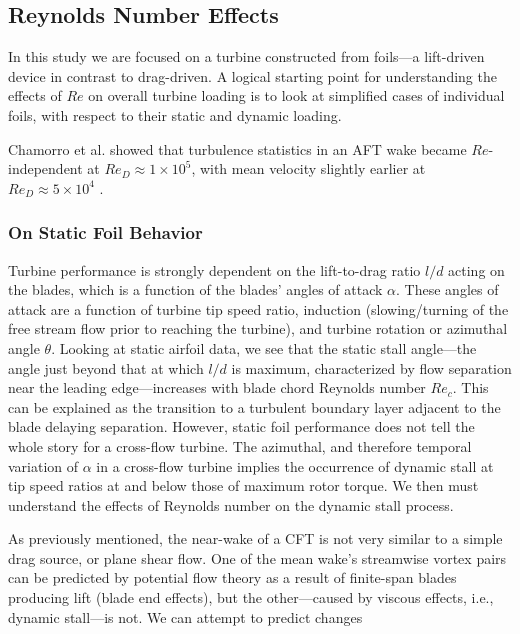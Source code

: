 \documentclass[energies,article,accept,moreauthors,pdftex,12pt,a4paper]{mdpi}
\begin{document}

\subsection{Reynolds Number Effects}

In this study we are focused on a turbine constructed from foils---a lift-driven
device in contrast to drag-driven. A logical starting point for understanding
the effects of $Re$ on overall turbine loading is to look at simplified cases
of individual foils, with respect to their static and dynamic loading. 

Chamorro et al. showed that turbulence statistics in an AFT wake became
$Re$-independent at $Re_D \approx 1 \times 10^5$, with mean velocity slightly
earlier at $Re_D \approx 5 \times 10^4$ \cite{Chamorro2012}.

\subsubsection{On Static Foil Behavior}

Turbine performance is strongly dependent on the lift-to-drag ratio $l/d$ acting
on the blades, which is a function of the blades' angles of attack $\alpha$.
These angles of attack are a function of turbine tip speed ratio, induction
(slowing/turning of the free stream flow prior to reaching the turbine), and
turbine rotation or azimuthal angle $\theta$. Looking at static airfoil data, we
see that the static stall angle---the angle just beyond that at which $l/d$ is
maximum, characterized by flow separation near the leading edge---increases with
blade chord Reynolds number $Re_c$. This can be explained as the transition to a
turbulent boundary layer adjacent to the blade delaying separation. However,
static foil performance does not tell the whole story for a cross-flow turbine.
The azimuthal, and therefore temporal variation of $\alpha$ in a cross-flow
turbine implies the occurrence of dynamic stall at tip speed ratios at and below
those of maximum rotor torque\cite{Para2002}. We then must understand the
effects of Reynolds number on the dynamic stall process.

As previously mentioned, the near-wake of a CFT is not very similar to a simple
drag source, or plane shear flow. One of the mean wake's streamwise vortex pairs
can be predicted by potential flow theory as a result of finite-span blades
producing lift (blade end effects), but the other---caused by viscous effects,
i.e., dynamic stall---is not. We can attempt to predict changes
\end{document}
